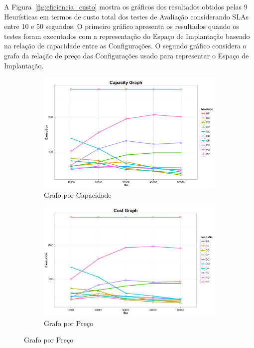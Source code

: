 A Figura~\ref{fig:eficiencia_custo} mostra os gráficos dos resultados obtidos pelas
9 Heurísticas em termos de custo total dos testes de Avaliação considerando SLAs 
entre 10 e 50 segundos. O primeiro gráfico apresenta os resultados quando os testes
foram executados com a representação do Espaço de Implantação baseado na relação de
capacidade entre as Configurações. O segundo gráfico considera o grafo da relação
de preço das Configurações usado para representar o Espaço de Implantação.

\begin{figure}[hbt]
  \caption{\label{fig:eficiencia_execucoes}Avaliação da Eficiência do Número de Execuções das Heurísticas}
  \centering
    \begin{subfigure}[a]{0.7\textwidth}
      \includegraphics[width=\textwidth]{img/ExecutionCount-Capacity}
      \caption{Grafo por Capacidade}
      \label{fig:eficiencia_execucoes_capacidade}
    \end{subfigure}
    \begin{subfigure}[b]{0.7\textwidth}
      \includegraphics[width=\textwidth]{img/ExecutionCount-Price}
      \caption{Grafo por Preço}
      \label{fig:eficiencia_execucoes_preco}
    \end{subfigure}
\end{figure}

